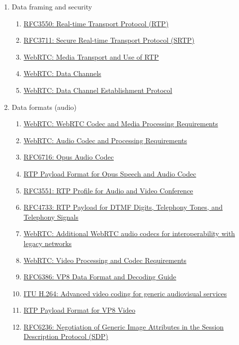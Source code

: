 \documentclass[9pt]{extarticle}
\begin{document}
\begin{multicols}{2}
\begin{enumerate}
\item Data framing and security
    \begin{enumerate}
    \item \href{https://tools.ietf.org/html/rfc3550}{RFC3550: Real-time Transport Protocol (RTP)}
    \item \href{https://tools.ietf.org/html/rfc3711}{RFC3711: Secure Real-time Transport Protocol (SRTP)}
    \item \href{https://tools.ietf.org/html/draft-ietf-rtcweb-rtp-usage-23}{WebRTC: Media Transport and Use of RTP}
    \item \href{https://tools.ietf.org/html/draft-ietf-rtcweb-data-channel-13}{WebRTC: Data Channels}
    \item \href{https://tools.ietf.org/html/draft-ietf-rtcweb-data-protocol-09}{WebRTC: Data Channel Establishment Protocol}
    \end{enumerate}
\item Data formats (audio)
    \begin{enumerate}
    \item \href{https://tools.ietf.org/html/draft-cbran-rtcweb-codec-02}{WebRTC: WebRTC Codec and Media Processing Requirements}
    \item \href{https://tools.ietf.org/html/draft-ietf-rtcweb-audio-07}{WebRTC: Audio Codec and Processing Requirements}
    \item \href{https://tools.ietf.org/html/rfc6716}{RFC6716: Opus Audio Codec}
    \item \href{https://tools.ietf.org/html/draft-ietf-payload-rtp-opus-11}{RTP Payload Format for Opus Speech and Audio Codec}
    \item \href{https://tools.ietf.org/html/rfc3551}{RFC3551: RTP Profile for Audio and Video Conference}
    \item \href{https://tools.ietf.org/html/rfc4733}{RFC4733: RTP Payload for DTMF Digits, Telephony Tones, and Telephony Signals}
    \item \href{https://tools.ietf.org/html/draft-ietf-rtcweb-audio-codecs-for-interop-01}{WebRTC: Additional WebRTC audio codecs for interoperability with legacy networks}
    \item \href{https://tools.ietf.org/html/draft-ietf-rtcweb-video-05}{WebRTC: Video Processing and Codec Requirements}
    \item \href{https://tools.ietf.org/html/rfc6386}{RFC6386: VP8 Data Format and Decoding Guide}
    \item \href{http://www.itu.int/rec/T-REC-H.264}{ITU H.264: Advanced video coding for generic audiovisual services}
    \item \href{https://tools.ietf.org/html/draft-ietf-payload-vp8-15}{RTP Payload Format for VP8 Video}
    \item \href{https://tools.ietf.org/html/rfc6236}{RFC6236: Negotiation of Generic Image Attributes in the Session Description Protocol (SDP)}
    \end{enumerate}


\end{enumerate}
\end{multicols}
\end{document}
